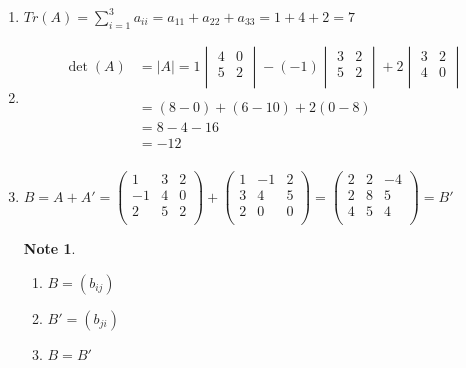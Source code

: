 \documentclass[11pt,a4paper]{article}
\theoremstyle{definition}
\newtheorem{note}[thm]{Note}
\begin{document}
\begin{enumerate}
\item $\displaystyle{Tr(A) = \sum^3_{i=1}a_{ii} = a_{11} + a_{22} + a_{33} = 1 + 4 + 2 = 7}$

\item 
\begin{align*}
\det (A) & = |A| = 1 \begin{vmatrix}
4 & 0\\
5 & 2\\
\end{vmatrix} - (-1)
\begin{vmatrix}
3 & 2\\
5 & 2\\
\end{vmatrix} + 2 \begin{vmatrix}
3 & 2\\
4 & 0\\
\end{vmatrix}\\\\
& = (8-0) + (6-10) + 2(0-8)\\
& = 8 - 4 - 16\\
& = -12\\
\end{align*}

\item\quad 
$\displaystyle{
B = A + A'  = \begin{pmatrix}
1 & 3 & 2\\
-1& 4 & 0\\
2 & 5 & 2\\
\end{pmatrix} + \begin{pmatrix}
1 & -1 & 2\\
3 & 4 &  5\\
2 & 0 & 0\\
\end{pmatrix}
 = \begin{pmatrix}
2 & 2 & -4\\
2 & 8 & 5\\
4 & 5 & 4\\
 \end{pmatrix}
= B'}$

\begin{note}
\begin{enumerate}
\item $B = (b_{ij})$
\item $B' = (b_{ji})$
\item $B = B'$\\\\
\end{enumerate}
\end{note}
\end{enumerate}
\end{document}
